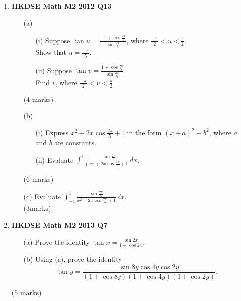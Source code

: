 \documentclass{report}
\begin{document}
\begin{enumerate}
	\item \textbf{HKDSE Math M2 2012 Q13}
	\begin{enumerate}
		\item [(a)]
		\begin{enumerate}
			\item [(i)]Suppose $\tan{u} = \displaystyle\frac{-1 + \cos{\displaystyle\frac{2\pi}{5}}}{\sin{\displaystyle\frac{2\pi}{5}}}$, where $\displaystyle\frac{-\pi}{2} < u < \frac{\pi}{2}$. \\
			Show that $u = \displaystyle\frac{-\pi}{5}$. 
			\item [(ii)]Suppose $\tan{v} = \displaystyle\frac{1+\cos{\displaystyle\frac{2\pi}{5}}}{\sin{\displaystyle\frac{2\pi}{5}}}$. \\
			Find $v$, where $\displaystyle\frac{-\pi}{2} < v < \frac{\pi}{2}$.
		\end{enumerate}
		(4 marks)
		\item[(b)]
		\begin{enumerate}
			\item[(i)]Express $x^2 + 2x\cos{\displaystyle\frac{2\pi}{5}} + 1$ in the form $(x+a)^2 + b^2$, where $a$ and $b$ are constants. 
			\item[(ii)]Evaluate $\displaystyle\int_{-1}^{1}\frac{\sin{\displaystyle\frac{2\pi}{5}}}{x^2 + 2x\cos{\displaystyle\frac{2\pi}{5}}+1}\, dx$.
		\end{enumerate}
		(6 marks)
		\item[(c)]Evaluate $\displaystyle\int_{-1}^{1}\frac{\sin{\displaystyle\frac{7\pi}{5}}}{x^2 + 2x\cos{\displaystyle\frac{7\pi}{5}}+1} \,dx$. \\(3marks)
	\end{enumerate}

	\item \textbf{HKDSE Math M2 2013 Q7}
	\begin{enumerate}
		\item [(a)]Prove the identity $\tan{x} = \displaystyle\frac{\sin{2x}}{1+\cos{2x}}$. 
		\item [(b)]Using (a), prove the identity $$\tan{y} = \displaystyle\frac{\sin{8y}\cos{4y}\cos{2y}}{(1+\cos{8y})(1+\cos{4y})(1+\cos{2y})}.$$
	\end{enumerate}
	(5 marks)

	\newpage


\end{enumerate}
\end{document}
